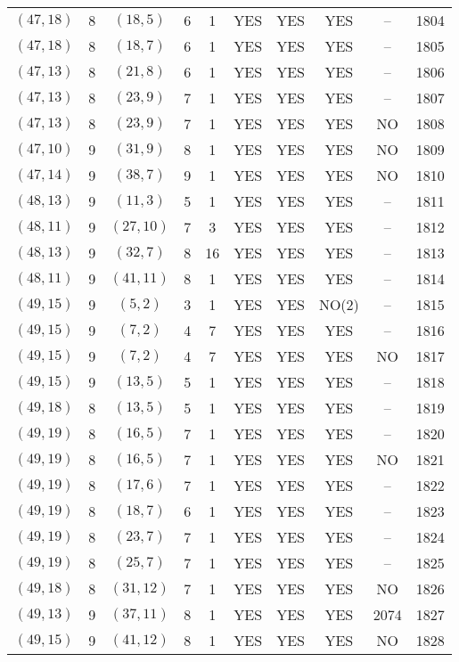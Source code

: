 \begin{longtable}{|c|c|c|c|c|c|c|c|c|c|}
$(47, 18)$ & 8 & $(18, 5)$ & 6 & 1 & YES & YES & YES & -- & 1804\\
$(47, 18)$ & 8 & $(18, 7)$ & 6 & 1 & YES & YES & YES & -- & 1805\\
$(47, 13)$ & 8 & $(21, 8)$ & 6 & 1 & YES & YES & YES & -- & 1806\\
$(47, 13)$ & 8 & $(23, 9)$ & 7 & 1 & YES & YES & YES & -- & 1807\\
$(47, 13)$ & 8 & $(23, 9)$ & 7 & 1 & YES & YES & YES & NO & 1808\\
$(47, 10)$ & 9 & $(31, 9)$ & 8 & 1 & YES & YES & YES & NO & 1809\\
$(47, 14)$ & 9 & $(38, 7)$ & 9 & 1 & YES & YES & YES & NO & 1810\\
$(48, 13)$ & 9 & $(11, 3)$ & 5 & 1 & YES & YES & YES & -- & 1811\\
$(48, 11)$ & 9 & $(27, 10)$ & 7 & 3 & YES & YES & YES & -- & 1812\\
$(48, 13)$ & 9 & $(32, 7)$ & 8 & 16 & YES & YES & YES & -- & 1813\\
$(48, 11)$ & 9 & $(41, 11)$ & 8 & 1 & YES & YES & YES & -- & 1814\\
$(49, 15)$ & 9 & $(5, 2)$ & 3 & 1 & YES & YES & NO(2) & -- & 1815\\
$(49, 15)$ & 9 & $(7, 2)$ & 4 & 7 & YES & YES & YES & -- & 1816\\
$(49, 15)$ & 9 & $(7, 2)$ & 4 & 7 & YES & YES & YES & NO & 1817\\
$(49, 15)$ & 9 & $(13, 5)$ & 5 & 1 & YES & YES & YES & -- & 1818\\
$(49, 18)$ & 8 & $(13, 5)$ & 5 & 1 & YES & YES & YES & -- & 1819\\
$(49, 19)$ & 8 & $(16, 5)$ & 7 & 1 & YES & YES & YES & -- & 1820\\
$(49, 19)$ & 8 & $(16, 5)$ & 7 & 1 & YES & YES & YES & NO & 1821\\
$(49, 19)$ & 8 & $(17, 6)$ & 7 & 1 & YES & YES & YES & -- & 1822\\
$(49, 19)$ & 8 & $(18, 7)$ & 6 & 1 & YES & YES & YES & -- & 1823\\
$(49, 19)$ & 8 & $(23, 7)$ & 7 & 1 & YES & YES & YES & -- & 1824\\
$(49, 19)$ & 8 & $(25, 7)$ & 7 & 1 & YES & YES & YES & -- & 1825\\
$(49, 18)$ & 8 & $(31, 12)$ & 7 & 1 & YES & YES & YES & NO & 1826\\
$(49, 13)$ & 9 & $(37, 11)$ & 8 & 1 & YES & YES & YES & 2074 & 1827\\
$(49, 15)$ & 9 & $(41, 12)$ & 8 & 1 & YES & YES & YES & NO & 1828\\

\end{longtable}
